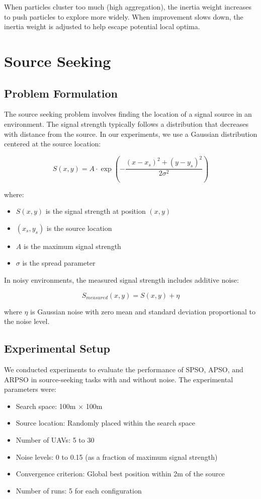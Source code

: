 \documentclass[conference]{IEEEtran}
\begin{document}
When particles cluster too much (high aggregation), the inertia weight increases to push particles to explore more widely. When improvement slows down, the inertia weight is adjusted to help escape potential local optima.

\section{Source Seeking}
\subsection{Problem Formulation}
The source seeking problem involves finding the location of a signal source in an environment. The signal strength typically follows a distribution that decreases with distance from the source. In our experiments, we use a Gaussian distribution centered at the source location:

\begin{equation}
S(x,y) = A \cdot \exp\left(-\frac{(x-x_s)^2 + (y-y_s)^2}{2\sigma^2}\right)
\end{equation}

where:
\begin{itemize}
    \item $S(x,y)$ is the signal strength at position $(x,y)$
    \item $(x_s, y_s)$ is the source location
    \item $A$ is the maximum signal strength
    \item $\sigma$ is the spread parameter
\end{itemize}

In noisy environments, the measured signal strength includes additive noise:

\begin{equation}
S_{measured}(x,y) = S(x,y) + \eta
\end{equation}

where $\eta$ is Gaussian noise with zero mean and standard deviation proportional to the noise level.

\subsection{Experimental Setup}
We conducted experiments to evaluate the performance of SPSO, APSO, and ARPSO in source-seeking tasks with and without noise. The experimental parameters were:

\begin{itemize}
    \item Search space: 100m × 100m
    \item Source location: Randomly placed within the search space
    \item Number of UAVs: 5 to 30
    \item Noise levels: 0 to 0.15 (as a fraction of maximum signal strength)
    \item Convergence criterion: Global best position within 2m of the source
    \item Number of runs: 5 for each configuration
\end{itemize}
\end{document}
